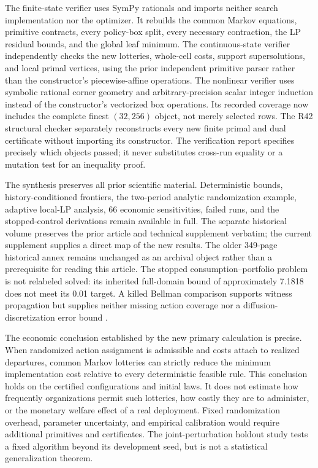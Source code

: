 The finite-state verifier uses SymPy rationals and imports neither search implementation nor the optimizer. It rebuilds the common Markov equations, primitive contracts, every policy-box split, every necessary contraction, the LP residual bounds, and the global leaf minimum. The continuous-state verifier independently checks the new lotteries, whole-cell costs, support supersolutions, and local primal vertices, using the prior independent primitive parser rather than the constructor's piecewise-affine operations. The nonlinear verifier uses symbolic rational corner geometry and arbitrary-precision scalar integer induction instead of the constructor's vectorized box operations. Its recorded coverage now includes the complete finest $(32,256)$ object, not merely selected rows. The R42 structural checker separately reconstructs every new finite primal and dual certificate without importing its constructor. The verification report specifies precisely which objects passed; it never substitutes cross-run equality or a mutation test for an inequality proof.

The synthesis preserves all prior scientific material. Deterministic bounds, history-conditioned frontiers, the two-period analytic randomization example, adaptive local-LP analysis, 66 economic sensitivities, failed runs, and the stopped-control derivations remain available in full. The separate historical volume preserves the prior article and technical supplement verbatim; the current supplement supplies a direct map of the new results. The older 349-page historical annex remains unchanged as an archival object rather than a prerequisite for reading this article. The stopped consumption--portfolio problem is not relabeled solved: its inherited full-domain bound of approximately 7.1818 does not meet its 0.01 target. A killed Bellman comparison supports witness propagation but supplies neither missing action coverage nor a diffusion-discretization error bound \citep{KushnerDupuis2001}.

The economic conclusion established by the new primary calculation is precise. When randomized action assignment is admissible and costs attach to realized departures, common Markov lotteries can strictly reduce the minimum implementation cost relative to every deterministic feasible rule. This conclusion holds on the certified configurations and initial laws. It does not estimate how frequently organizations permit such lotteries, how costly they are to administer, or the monetary welfare effect of a real deployment. Fixed randomization overhead, parameter uncertainty, and empirical calibration would require additional primitives and certificates. The joint-perturbation holdout study tests a fixed algorithm beyond its development seed, but is not a statistical generalization theorem.


